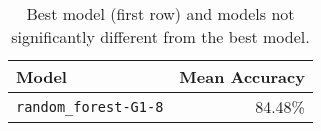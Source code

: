 \begin{table}[H]
\centering
\begin{tabularx}{0.48\textwidth}{|X|r|}
\hline
Model & Mean Accuracy \\
\hline
\texttt{random\_forest-G1-8} & 84.48\% \\
\hline
\end{tabularx}
\caption{Best model (first row) and models not significantly different from the best model.}
\label{tab:best_models}

\end{table}
